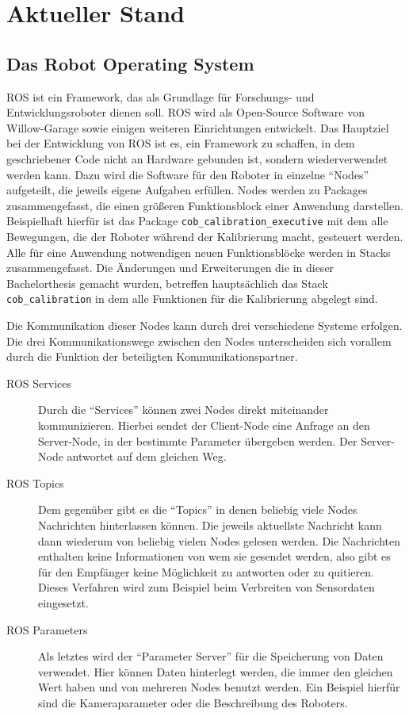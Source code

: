 \chapter{Aktueller Stand} \section{Das Robot Operating System}

\ac{ROS} ist ein Framework, das als Grundlage für Forschungs- und
Entwicklungsroboter dienen soll. \ac{ROS} wird als Open-Source Software von
Willow-Garage sowie einigen weiteren Einrichtungen entwickelt. Das Hauptziel bei
der Entwicklung von \ac{ROS} ist es, ein Framework zu schaffen, in dem
geschriebener Code nicht an Hardware gebunden ist, sondern wiederverwendet
werden kann. Dazu wird die Software für den Roboter in einzelne ``Nodes''
aufgeteilt, die jeweils eigene Aufgaben erfüllen. Nodes werden zu Packages
zusammengefasst, die einen größeren Funktionsblock einer Anwendung darstellen.
Beispielhaft hierfür ist das Package \texttt{cob\_calibration\_executive} mit
dem alle Bewegungen, die der Roboter während der Kalibrierung macht, gesteuert
werden. Alle für eine Anwendung notwendigen neuen Funktionsblöcke werden in
Stacks zusammengefasst. Die Änderungen und Erweiterungen die in dieser
Bachelorthesis gemacht wurden, betreffen hauptsächlich das Stack
\texttt{cob\_calibration} in dem alle Funktionen für die Kalibrierung abgelegt
sind. 

Die Kommunikation dieser Nodes kann durch drei verschiedene Systeme erfolgen.
Die drei Kommunikationswege zwischen den Nodes unterscheiden sich vorallem
durch die Funktion der beteiligten Kommunikationspartner. 

\begin{description}

  \item[\ac{ROS} Services] Durch die ``Services'' können zwei Nodes direkt
    miteinander kommunizieren. Hierbei sendet der Client-Node eine Anfrage an
    den Server-Node, in der bestimmte Parameter übergeben werden. Der
    Server-Node antwortet auf dem gleichen Weg.


  \item[\ac{ROS} Topics]Dem gegenüber gibt es die ``Topics'' in denen beliebig
    viele Nodes Nachrichten hinterlassen können. Die jeweils aktuellste
    Nachricht kann dann wiederum von beliebig vielen Nodes gelesen werden. Die
    Nachrichten enthalten keine Informationen von wem sie gesendet werden, also
    gibt es für den Empfänger keine Möglichkeit zu antworten oder zu quitieren.
    Dieses Verfahren wird zum Beispiel beim Verbreiten von Sensordaten
    eingesetzt.


  \item[\ac{ROS} Parameters]Als letztes wird der ``Parameter Server'' für die
    Speicherung von Daten verwendet. Hier können Daten hinterlegt werden, die
    immer den gleichen Wert haben und von mehreren Nodes benutzt werden. Ein
    Beispiel hierfür sind die Kameraparameter oder die Beschreibung des
    Roboters. 

\end{description}

